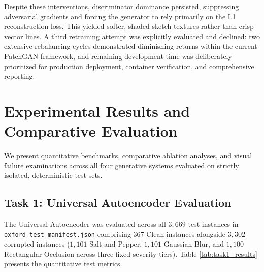 \documentclass[conference]{IEEEtran}
\begin{document}
Despite these interventions, discriminator dominance persisted, suppressing adversarial gradients and forcing the generator to rely primarily on the L1 reconstruction loss. This yielded softer, shaded sketch textures rather than crisp vector lines. A third retraining attempt was explicitly evaluated and declined: two extensive rebalancing cycles demonstrated diminishing returns within the current PatchGAN framework, and remaining development time was deliberately prioritized for production deployment, container verification, and comprehensive reporting.

\section{Experimental Results and Comparative Evaluation}
We present quantitative benchmarks, comparative ablation analyses, and visual failure examinations across all four generative systems evaluated on strictly isolated, deterministic test sets.

\subsection{Task 1: Universal Autoencoder Evaluation}
The Universal Autoencoder was evaluated across all $3,669$ test instances in \texttt{oxford\_test\_manifest.json} comprising $367$ Clean instances alongside $3,302$ corrupted instances ($1,101$ Salt-and-Pepper, $1,101$ Gaussian Blur, and $1,100$ Rectangular Occlusion across three fixed severity tiers). Table \ref{tab:task1_results} presents the quantitative test metrics.

\begin{table}[!t]
\centering
\caption{Task 1 Universal Autoencoder Test Benchmark ($N=3,669$).}
\label{tab:task1_results}
\end{table}
\end{document}
